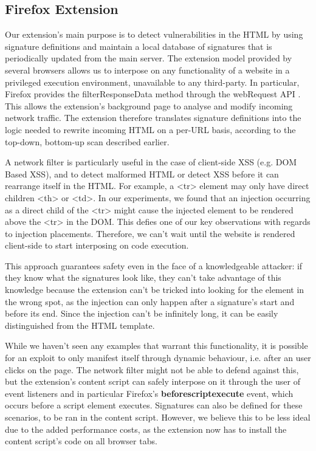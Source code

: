  \subsection{Firefox Extension}
Our extension's main purpose is to detect vulnerabilities in the HTML by using signature definitions and maintain a local database of signatures that is periodically updated from the main server.
The extension model provided by several browsers allows us to interpose on any functionality of a website in a privileged execution environment, unavailable to any third-party. In particular, Firefox provides the filterResponseData method through the webRequest API \cite{webRequest} . This allows the extension's background page to analyse and modify incoming network traffic. The extension therefore translates signature definitions into the logic needed to rewrite incoming HTML on a per-URL basis, according to the top-down, bottom-up scan described earlier. 

A network filter is particularly useful in the case of client-side XSS (e.g. DOM Based XSS), and to detect malformed HTML or detect XSS before it can rearrange itself in the HTML. For example, a <tr> element may only have direct children <th> or <td>. In our experiments, we found that an injection occurring as a direct child of the <tr> might cause the injected element to be rendered above the <tr> in the DOM. This defies one of our key observations with regards to injection placements. Therefore, we can't wait until the website is rendered client-side to start interposing on code execution.

This approach guarantees safety even in the face of a knowledgeable attacker: if they know what the signatures look like, they can't take advantage of this knowledge because the extension can't be tricked into looking for the element in the wrong spot, as the injection can only happen after a signature's start and before its end. Since the injection can't be infinitely long, it can be easily distinguished from the HTML template.

While we haven't seen any examples that warrant this functionality, it is possible for an exploit to only manifest itself through dynamic behaviour, i.e. after an user clicks on the page. The network filter might not be able to defend against this, but the extension's content script can safely interpose on it through the user of event listeners and in particular Firefox's \textbf{beforescriptexecute} event, which occurs before a script element executes. Signatures can also be defined for these scenarios, to be ran in the content script. However, we believe this to be less ideal due to the added performance costs, as the extension now has to install the content script's code on all browser tabs.



